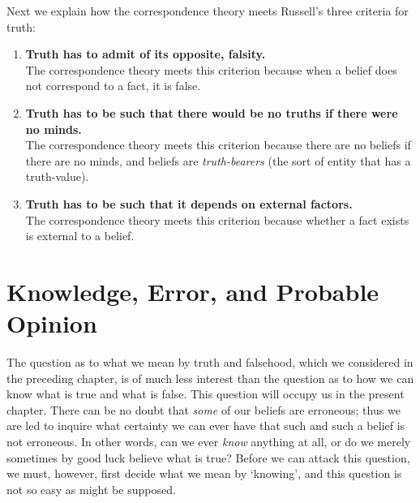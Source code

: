 \documentclass[oneside,letterpaper,12pt]{book}
\begin{document}
Next we explain how the correspondence theory meets Russell's three criteria for truth:
\begin{enumerate}
	\item \textbf{Truth has to admit of its opposite, falsity.} \\ The correspondence theory meets this criterion because when a belief does not correspond to a fact, it is false.
	\item \textbf{Truth has to be such that there would be no truths if there were no minds.} \\ The correspondence theory meets this criterion because there are no beliefs if there are no minds, and beliefs are \textit{truth-bearers} (the sort of entity that has a truth-value).
	\item \textbf{Truth has to be such that it depends on external factors.} \\ The correspondence theory meets this criterion because whether a fact exists is external to a belief.
\end{enumerate}

\hypertarget{chapter-xiii.-knowledge-error-and-probable-opinion}{%
\chapter{Knowledge, Error, and Probable Opinion}\label{chapter-xiii.-knowledge-error-and-probable-opinion}}

The question as to what we mean by truth and falsehood, which we
considered in the preceding chapter, is of much less interest than the
question as to how we can know what is true and what is false. This
question will occupy us in the present chapter. There can be no doubt
that \emph{some} of our beliefs are erroneous; thus we are led to
inquire what certainty we can ever have that such and such a belief is
not erroneous. In other words, can we ever \emph{know} anything at all,
or do we merely sometimes by good luck believe what is true? Before we
can attack this question, we must, however, first decide what we mean by
`knowing', and this question is not so
easy as might be supposed.
\end{document}
